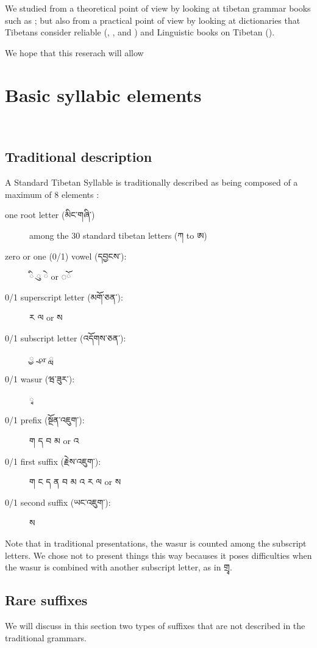 \documentclass[%
a4paper,%
pagesize,%
12pt,%
parskip=off,%
bibliography=totoc,%
numbers=noenddot,%
DIV=12,%
twoside=semi,%
headings=normal%
]{scrartcl}
\begin{document}
We studied from a theoretical point of view by looking at tibetan grammar books such as \cite{TsheshabGrammarTopics}; but also from a practical point of view by looking at dictionaries that Tibetans consider reliable (\cite{DorjeDagyig}, \cite{YisunTsikchen}, \cite{MonlamGrandDict} and \cite{DungkarEncyclopedia}) and Linguistic books on Tibetan (\cite{TournadreMST}).

We hope that this reserach will allow 

\section{Basic syllabic elements}

­\subsection{Traditional description}

A Standard Tibetan Syllable is traditionally described as being composed of a maximum of 8 elements :

\begin{description}
  \item[one root letter (མིང་གཞི་)] among the 30 standard tibetan letters (ཀ to ཨ)
  \item[zero or one (0/1) vowel (དབྱངས་):] {\tibetanfont ◌}ི {\tibetanfont ◌\kern 0.5mm}ུ {\tibetanfont ◌}ེ or {\tibetanfont ◌}ོ
  \item[0/1 superscript letter (མགོ་ཅན་):] ར ལ or ས
  \item[0/1 subscript letter (འདོགས་ཅན་):] ྱ ྲ or ླ
  \item[0/1 wasur (ཝ་ཟུར་):] ྭ
  \item[0/1 prefix (སྔོན་འཇུག་):] ག ད བ མ or འ
  \item[0/1 first suffix (རྗེས་འཇུག་):] ག ང ད ན བ མ འ ར ལ or ས
  \item[0/1 second suffix (ཡང་འཇུག་):] ས
\end{description}

Note that in traditional presentations, the wasur is counted among the subscript letters. We chose not to present things this way becauses it poses difficulties when the wasur is combined with another subscript letter, as in གྲྭ.

\subsection{Rare suffixes}

We will discuss in this section two types of suffixes that are not described in the traditional grammars.
\end{document}
